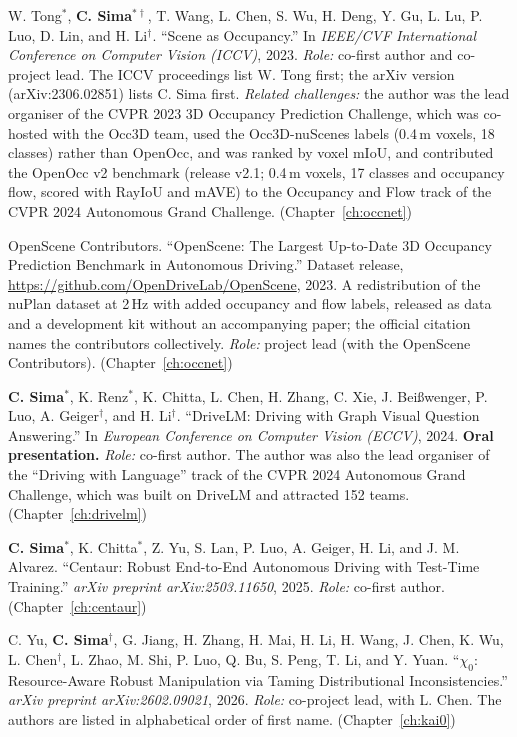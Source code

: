 \begin{enumerate}[label={[\arabic*]}, leftmargin=*, itemsep=4pt]
  \item W. Tong$^{*}$, \textbf{C. Sima}$^{*\dagger}$, T. Wang, L. Chen, S. Wu, H. Deng, Y. Gu, L. Lu, P. Luo, D. Lin, and H. Li$^{\dagger}$.
        ``Scene as Occupancy.''
        In \emph{IEEE/CVF International Conference on Computer Vision (ICCV)}, 2023.
        \emph{Role:} co-first author and co-project lead. The ICCV proceedings list W. Tong first; the arXiv version (arXiv:2306.02851) lists C. Sima first.
        \emph{Related challenges:} the author was the lead organiser of the CVPR 2023 3D Occupancy Prediction Challenge, which was co-hosted with the Occ3D team, used the Occ3D-nuScenes labels (0.4\,m voxels, 18 classes) rather than OpenOcc, and was ranked by voxel mIoU, and contributed the OpenOcc v2 benchmark (release v2.1; 0.4\,m voxels, 17 classes and occupancy flow, scored with RayIoU and mAVE) to the Occupancy and Flow track of the CVPR 2024 Autonomous Grand Challenge.
        \hfill (Chapter~\ref{ch:occnet})
  \item OpenScene Contributors.
        ``OpenScene: The Largest Up-to-Date 3D Occupancy Prediction Benchmark in Autonomous Driving.''
        Dataset release, \url{https://github.com/OpenDriveLab/OpenScene}, 2023.
        A redistribution of the nuPlan dataset at 2\,Hz with added occupancy and flow labels, released as data and a development kit without an accompanying paper; the official citation names the contributors collectively.
        \emph{Role:} project lead (with the OpenScene Contributors).
        \hfill (Chapter~\ref{ch:occnet})
  \item \textbf{C. Sima}$^{*}$, K. Renz$^{*}$, K. Chitta, L. Chen, H. Zhang, C. Xie, J. Bei{\ss}wenger, P. Luo, A. Geiger$^{\dagger}$, and H. Li$^{\dagger}$.
        ``DriveLM: Driving with Graph Visual Question Answering.''
        In \emph{European Conference on Computer Vision (ECCV)}, 2024. \textbf{Oral presentation.}
        \emph{Role:} co-first author. The author was also the lead organiser of the ``Driving with Language'' track of the CVPR 2024 Autonomous Grand Challenge, which was built on DriveLM and attracted 152 teams.
        \hfill (Chapter~\ref{ch:drivelm})
  \item \textbf{C. Sima}$^{*}$, K. Chitta$^{*}$, Z. Yu, S. Lan, P. Luo, A. Geiger, H. Li, and J. M. Alvarez.
        ``Centaur: Robust End-to-End Autonomous Driving with Test-Time Training.''
        \emph{arXiv preprint arXiv:2503.11650}, 2025.
        \emph{Role:} co-first author.
        \hfill (Chapter~\ref{ch:centaur})
  \item C. Yu, \textbf{C. Sima}$^{\dagger}$, G. Jiang, H. Zhang, H. Mai, H. Li, H. Wang, J. Chen, K. Wu, L. Chen$^{\dagger}$, L. Zhao, M. Shi, P. Luo, Q. Bu, S. Peng, T. Li, and Y. Yuan.
        ``$\chi_0$: Resource-Aware Robust Manipulation via Taming Distributional Inconsistencies.''
        \emph{arXiv preprint arXiv:2602.09021}, 2026.
        \emph{Role:} co-project lead, with L. Chen. The authors are listed in alphabetical order of first name.
        \hfill (Chapter~\ref{ch:kai0})
\end{enumerate}

